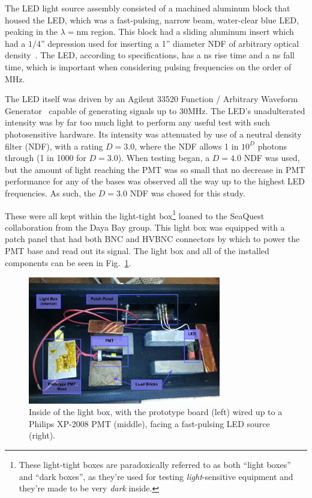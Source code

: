 The LED light source assembly consisted of a machined aluminum block that housed the LED, which was a fast-pulsing, narrow beam, water-clear blue LED, peaking in the $\lambda =$\unit[450]{nm} region. This block had a sliding aluminum insert which had a $1/4$'' depression used for inserting a 1'' diameter NDF of arbitrary optical density~\cite{ames1998measurement}. The LED, according to specifications, has a \unit[N]{ns} rise time and a \unit[N]{ns} fall time, which is important when considering pulsing frequencies on the order of \unit[30]{MHz}.

The LED itself was driven by an Agilent 33520 Function / Arbitrary Waveform Generator~\cite{agilent:33520} capable of generating signals up to 30MHz. The LED's unadulterated intensity was by far too much light to perform any useful test with such photosensitive hardware. Its intensity was attenuated by use of a neutral density filter (NDF), with a rating $D=3.0$, where the NDF allows 1 in $10^D$ photons through (1 in 1000 for $D=3.0$). When testing began, a $D=4.0$ NDF was used, but the amount of light reaching the PMT was so small that no decrease in PMT performance for any of the bases was observed all the way up to the highest LED frequencies. As such, the $D=3.0$ NDF was chosed for this study.

These were all kept within the light-tight box\footnote{These light-tight boxes are paradoxically referred to as both ``light boxes'' and ``dark boxes'', as they're used for testing \emph{light}-sensitive equipment and they're made to be very \emph{dark} inside.} loaned to the SeaQuest collaboration from the Daya Bay group. This light box was equipped with a patch panel that had both BNC and HVBNC connectors by which to power the PMT base and read out its signal. The light box and all of the installed components can be seen in Fig.~\ref{fig:pmtsetup}.

\begin{figure}
	\centerline{
		\mbox{\includegraphics[width=0.75\textwidth]{figures/LightBox.pdf}}
	}
	\caption{Inside of the light box, with the prototype board (left) wired up to a Philips XP-2008 PMT (middle), facing a fast-pulsing LED source (right).}
	\label{fig:pmtsetup}
\end{figure}

